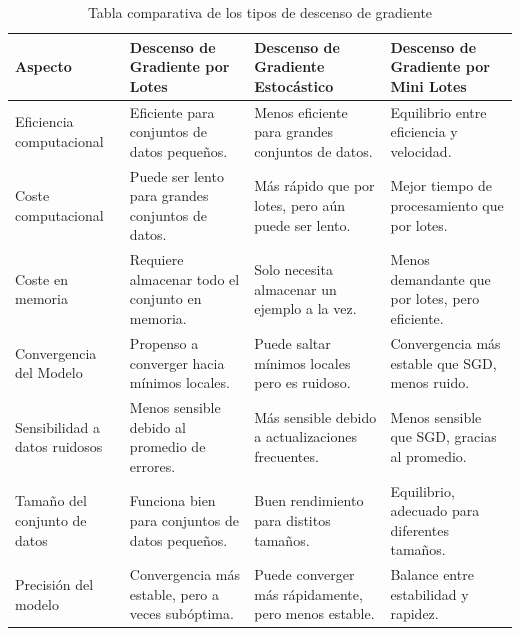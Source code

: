 \begin{table}[H]
    \centering
    \footnotesize
    \begin{tabularx}{0.95\linewidth}{|p{3cm}|X|X|X|}
        \hline
        \textbf{Aspecto}              & \textbf{Descenso de Gradiente por Lotes}          & \textbf{Descenso de Gradiente Estocástico}           & \textbf{Descenso de Gradiente por Mini Lotes}   \\
        \hline
        Eficiencia computacional      & Eficiente para conjuntos de datos pequeños.       & Menos eficiente para grandes conjuntos de datos.     & Equilibrio entre eficiencia y velocidad.        \\
        \hline
        Coste computacional           & Puede ser lento para grandes conjuntos de datos.  & Más rápido que por lotes, pero aún puede ser lento.  & Mejor tiempo de procesamiento que por lotes.    \\
        \hline
        Coste en memoria              & Requiere almacenar todo el conjunto en memoria.   & Solo necesita almacenar un ejemplo a la vez.         & Menos demandante que por lotes, pero eficiente. \\
        \hline
        Convergencia del Modelo       & Propenso a converger hacia mínimos locales.       & Puede saltar mínimos locales pero es ruidoso.        & Convergencia más estable que SGD, menos ruido.  \\
        \hline
        Sensibilidad a datos ruidosos & Menos sensible debido al promedio de errores.     & Más sensible debido a actualizaciones frecuentes.    & Menos sensible que SGD, gracias al promedio.    \\
        \hline
        Tamaño del conjunto de datos  & Funciona bien para conjuntos de datos pequeños.   & Buen rendimiento para distitos tamaños.              & Equilibrio, adecuado para diferentes tamaños.   \\
        \hline
        Precisión del modelo          & Convergencia más estable, pero a veces subóptima. & Puede converger más rápidamente, pero menos estable. & Balance entre estabilidad y rapidez.            \\
        \hline
    \end{tabularx}
    \caption{Tabla comparativa de los tipos de descenso de gradiente}
    \label{tab:tabla-comparativa}
\end{table}



